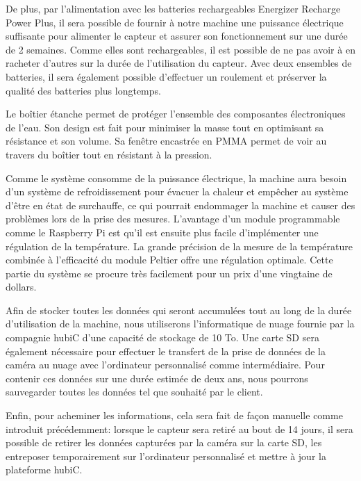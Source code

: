 De plus, par l'alimentation avec les batteries rechargeables Energizer Recharge Power Plus, il sera possible de fournir à notre machine une puissance électrique suffisante pour alimenter le capteur et assurer son fonctionnement sur une durée de 2 semaines. Comme elles sont rechargeables, il est possible de ne pas avoir à en racheter d'autres sur la durée de l'utilisation du capteur. Avec deux ensembles de batteries, il sera également possible d'effectuer un roulement et préserver la qualité des batteries plus longtemps.
\vspace{5mm}

Le boîtier étanche permet de protéger l'ensemble des composantes électroniques de l'eau. Son design est fait pour minimiser la masse tout en optimisant sa résistance et son volume. Sa fenêtre encastrée en PMMA permet de voir au travers du boîtier tout en résistant à la pression.
\vspace{5mm}

Comme le système consomme de la puissance électrique, la machine aura besoin d'un système de refroidissement pour évacuer la chaleur et empêcher au système d'être en état de surchauffe, ce qui pourrait endommager la machine et causer des problèmes lors de la prise des mesures. L'avantage d'un module programmable comme le Raspberry Pi est qu'il est ensuite plus facile d'implémenter une régulation de la température. La grande précision de la mesure de la température combinée à l'efficacité du module Peltier offre une régulation optimale. Cette partie du système se procure très facilement pour un prix d'une vingtaine de dollars.
\vspace{5mm}

Afin de stocker toutes les données qui seront accumulées tout au long de la durée d'utilisation de la machine, nous utiliserons l'informatique de nuage fournie par la compagnie hubiC d'une capacité de stockage de 10 To. Une carte SD sera également nécessaire pour effectuer le transfert de la prise de données de la caméra au nuage avec l'ordinateur personnalisé comme intermédiaire. Pour contenir ces données sur une durée estimée de deux ans, nous pourrons sauvegarder toutes les données tel que souhaité par le client.
\vspace{5mm}

Enfin, pour acheminer les informations, cela sera fait de façon manuelle comme introduit précédemment: lorsque le capteur sera retiré au bout de 14 jours, il sera possible de retirer les données capturées par la caméra sur la carte SD, les entreposer temporairement sur l'ordinateur personnalisé et mettre à jour la plateforme hubiC.
\vspace{5mm}

